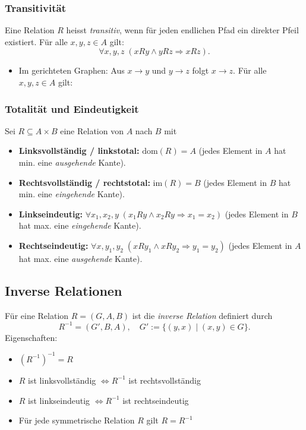 \subsubsection{Transitivität}
Eine Relation \(R\) heisst \emph{transitiv}, wenn für jeden endlichen Pfad ein direkter Pfeil existiert. Für alle \(x,y,z\in A\) gilt:
\[
  \forall x,y,z\;(xRy\land yRz\Rightarrow xRz).
\]
\begin{itemize}
    \item Im gerichteten Graphen: Aus \(x\to y\) und \(y\to z\) folgt \(x\to z\). Für alle \(x,y,z\in A\) gilt:\\
\end{itemize}

\subsubsection{Totalität und Eindeutigkeit}
Sei \(R\subseteq A\times B\) eine Relation von \(A\) nach \(B\) mit
\begin{itemize}
  \item \textbf{Linksvollständig / linkstotal:} \(\mathrm{dom}(R)=A\) (jedes Element in \(A\) hat min. eine \emph{ausgehende} Kante).
  \item \textbf{Rechtsvollständig / rechtstotal:} \(\mathrm{im}(R)=B\) (jedes Element in \(B\) hat min. eine \emph{eingehende} Kante).
  \item \textbf{Linkseindeutig:} \(\forall x_1,x_2,y\;(x_1Ry\land x_2Ry\Rightarrow x_1=x_2)\) (jedes Element in \(B\) hat max. eine \emph{eingehende} Kante).
  \item \textbf{Rechtseindeutig:} \(\forall x,y_1,y_2\;(xRy_1\land xRy_2\Rightarrow y_1=y_2)\) (jedes Element in \(A\) hat max. eine \emph{ausgehende} Kante).
\end{itemize}

\subsection{Inverse Relationen}
Für eine Relation $R = (G, A, B)$ ist die \emph{inverse Relation} definiert durch
\[
R^{-1} = (G', B, A), \quad G' := \{ (y,x) \mid (x,y) \in G \}.
\]
Eigenschaften:
\begin{itemize}
    \item $(R^{-1})^{-1} = R$
    \item $R$ ist linksvollständig $\Leftrightarrow R^{-1}$ ist rechtsvollständig
    \item $R$ ist linkseindeutig $\Leftrightarrow R^{-1}$ ist rechtseindeutig
    \item Für jede symmetrische Relation $R$ gilt $R = R^{-1}$
\end{itemize}